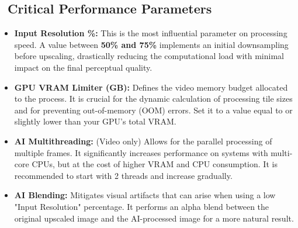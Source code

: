 \documentclass[11pt, a4paper]{article}
\begin{document}
\subsection{\faSlidersH\ Critical Performance Parameters}
\begin{itemize}[leftmargin=*, itemsep=2pt]
    \item \textbf{Input Resolution \%:} This is the most influential parameter on processing speed. A value between \textbf{50\% and 75\%} implements an initial downsampling before upscaling, drastically reducing the computational load with minimal impact on the final perceptual quality.
    \item \textbf{GPU VRAM Limiter (GB):} Defines the video memory budget allocated to the process. It is crucial for the dynamic calculation of processing tile sizes and for preventing out-of-memory (OOM) errors. Set it to a value equal to or slightly lower than your GPU's total VRAM.
    \item \textbf{AI Multithreading:} (Video only) Allows for the parallel processing of multiple frames. It significantly increases performance on systems with multi-core CPUs, but at the cost of higher VRAM and CPU consumption. It is recommended to start with 2 threads and increase gradually.
    \item \textbf{AI Blending:} Mitigates visual artifacts that can arise when using a low "Input Resolution" percentage. It performs an alpha blend between the original upscaled image and the AI-processed image for a more natural result.
\end{itemize}
\end{document}
